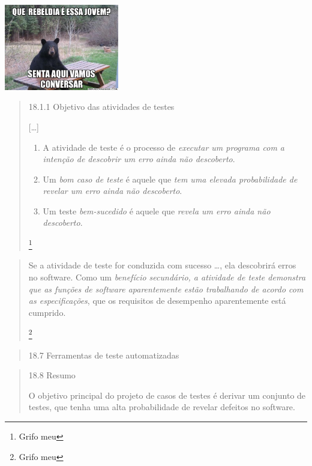 \begin{frame}{\subsecname}
  \begin{center}
    \includegraphics[width=5cm]{images/rebeldia}
  \end{center}
\end{frame}

\begin{frame}{\subsecname}
  \blockquote[{\cite[Pressman]{pressman_engenharia_1995}}]{
    18.1.1 Objetivo das atividades de testes

    [\ldots]
    \begin{enumerate}
      \item A atividade de teste é o processo de \emph{executar um programa com
          a intenção de descobrir um erro ainda não descoberto}.
      \item Um \emph{bom caso de teste} é aquele que \emph{tem uma elevada
        probabilidade de revelar um erro ainda não descoberto}.
      \item Um teste \emph{bem-sucedido} é aquele que \emph{revela um erro
          ainda não descoberto}.
    \end{enumerate}

    \let\thefootnote\relax\footnote{Grifo meu}
  }
\end{frame}

\begin{frame}{\subsecname}
  \blockquote[{\cite[Pressman]{pressman_engenharia_1995}}]{
    Se a atividade de teste for conduzida com sucesso \ldots, ela descobrirá
    erros no software. Como um \emph{benefício secundário, a atividade de
    teste demonstra que as funções de software aparentemente estão trabalhando de
    acordo com as especificações}, que os requisitos de desempenho aparentemente
    está cumprido.

    \let\thefootnote\relax\footnote{Grifo meu}
  }
\end{frame}

\begin{frame}{\subsecname}
  \blockquote[{\cite[Pressman]{pressman_engenharia_1995}}]{
    18.7 Ferramentas de teste automatizadas
  }
\end{frame}

\begin{frame}{\subsecname}
  \blockquote[{\cite[Pressman]{pressman_engenharia_1995}}]{
    18.8 Resumo

    O objetivo principal do projeto de casos de testes é derivar um conjunto de
    testes, que tenha uma alta probabilidade de revelar defeitos no software.
  }
\end{frame}

